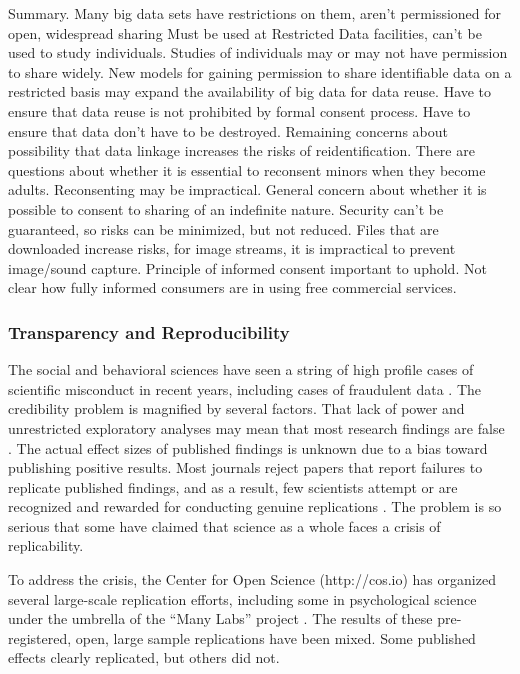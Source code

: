 \documentclass[letterpaper,man,apacite]{apa6}
\begin{document}
Summary.
Many big data sets have restrictions on them, aren't permissioned for open, widespread sharing
Must be used at Restricted Data facilities, can't be used to study individuals.
Studies of individuals may or may not have permission to share widely.
New models for gaining permission to share identifiable data on a restricted basis may expand the availability of big data for data reuse.
Have to ensure that data reuse is not prohibited by formal consent process.
Have to ensure that data don't have to be destroyed.
Remaining concerns about possibility that data linkage increases the risks of reidentification.
There are questions about whether it is essential to reconsent minors when they become adults.
Reconsenting may be impractical.
General concern about whether it is possible to consent to sharing of an indefinite nature.
Security can't be guaranteed, so risks can be minimized, but not reduced.
Files that are downloaded increase risks, for image streams, it is impractical to prevent image/sound capture.
Principle of informed consent important to uphold.
Not clear how fully informed consumers are in using free commercial services.

\subsubsection{Transparency and Reproducibility}

The social and behavioral sciences have seen a string of high profile cases of scientific misconduct in recent years, including cases of fraudulent data \cite{}.
The credibility problem is magnified by several factors.
That lack of power and unrestricted exploratory analyses may mean that most research findings are false \cite{Ioanides}.
The actual effect sizes of published findings is unknown due to a bias toward publishing positive results.
Most journals reject papers that report failures to replicate published findings, and as a result, few scientists attempt or are recognized and rewarded for conducting genuine replications \cite{Nosek-Spies}.
The problem is so serious that some have claimed that science as a whole faces a crisis of replicability.

To address the crisis, the Center for Open Science (http://cos.io) has organized several large-scale replication efforts, including some in psychological science under the umbrella of the ``Many Labs'' project \cite{klein, https://osf.io/ct89g/; https://osf.io/8cd4r/}.
The results of these pre-registered, open, large sample replications have been mixed.
Some published effects clearly replicated, but others did not.
\end{document}
